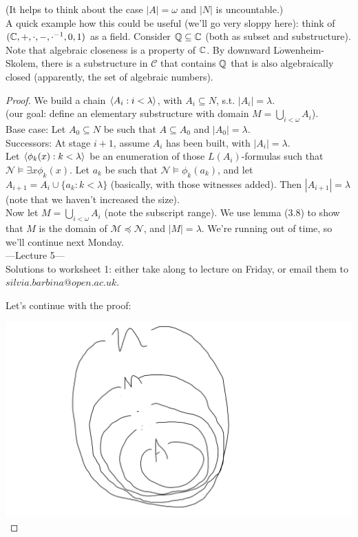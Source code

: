 \documentclass[a4paper]{article}
\begin{document}
\begin{thm}
    (It helps to think about the case $|A| = \omega$ and $|N|$ is uncountable.)\\
    A quick example how this could be useful (we'll go very sloppy here): think of $(\mathbb{C},+,\cdot,-,\cdot^{-1},0,1)$ as a field. Consider $\mathbb{Q} \subseteq \mathbb{C}$ (both as subset and substructure). Note that algebraic closeness is a property of $\mathbb{C}$. By downward L$\ddot{o}$wenheim-Skolem, there is a substructure in $\mathcal{C}$ that contains $\mathbb{Q}$ that is also algebraically closed (apparently, the set of algebraic numbers).
    \begin{proof}
        We build a chain $\langle A_i : i < \lambda \rangle$, with $A_i \subseteq N$, s.t. $|A_i| = \lambda$.\\
        (our goal: define an elementary substructure with domain $M=\bigcup_{i < \omega} A_i$).\\
        Base case: Let $A_0 \subseteq N$ be such that $A \subseteq A_0$ and $|A_0| = \lambda$.\\
        Successors: At stage $i+1$, assume $A_i$ has been built, with $|A_i| = \lambda$.\\
        Let $\langle \phi_k(x): k < \lambda \rangle$ be an enumeration of those $L(A_i)$-formulas such that $\mathcal{N} \vDash \exists x \phi_k(x)$. Let $a_k$ be such that $\mathcal{N} \vDash \phi_k(a_k)$, and let $A_{i+1} = A_i \cup \{a_k: k < \lambda\}$ (basically, with those witnesses added). Then $|A_{i+1}| = \lambda$ (note that we haven't increased the size).\\
        Now let $M = \bigcup_{i < \omega} A_i$ (note the subscript range). We use lemma (3.8) to show that $M$ is the domain of $\mathcal{M} \preccurlyeq \mathcal{N}$, and $|M| = \lambda$.
        We're running out of time, so we'll continue next Monday.\\
        
        ---Lecture 5---\\
        Solutions to worksheet 1: either take along to lecture on Friday, or email them to $silvia.barbina@open.ac.uk$.

        Let's continue with the proof:

        \includegraphics[scale=0.5]{image/Model_02.png}


\end{proof}
\end{thm}
\end{document}
